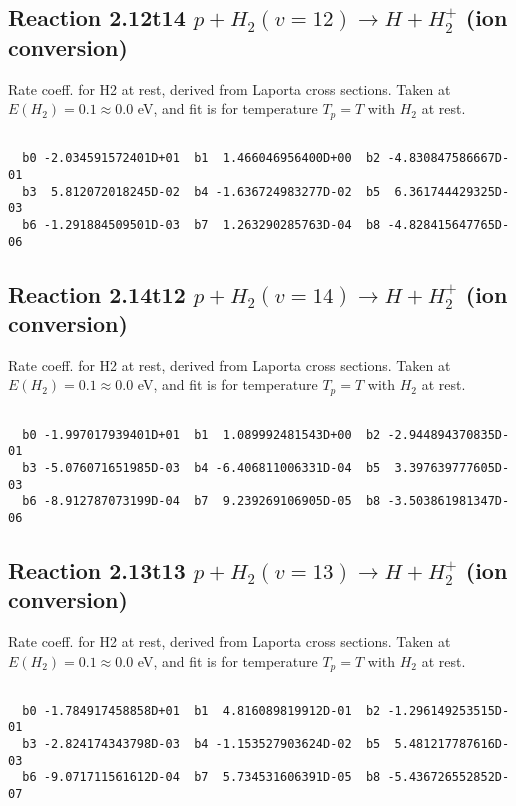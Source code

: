 \newpage
\subsection{
Reaction 2.12t14
$ p + H_2(v=12) \rightarrow H + H_2^+$ (ion conversion)
}
Rate coeff. for H2 at rest, derived from Laporta cross sections.
Taken at $E(H_2) = 0.1 \approx 0.0$ eV,  and fit is for temperature $T_p=T$ with $H_2$ at rest.

\begin{small}\begin{verbatim}

  b0 -2.034591572401D+01  b1  1.466046956400D+00  b2 -4.830847586667D-01
  b3  5.812072018245D-02  b4 -1.636724983277D-02  b5  6.361744429325D-03
  b6 -1.291884509501D-03  b7  1.263290285763D-04  b8 -4.828415647765D-06

\end{verbatim}\end{small}

\newpage
\subsection{
Reaction 2.14t12
$ p + H_2(v=14) \rightarrow H + H_2^+$ (ion conversion)
}
Rate coeff. for H2 at rest, derived from Laporta cross sections.
Taken at $E(H_2) = 0.1 \approx 0.0$ eV,  and fit is for temperature $T_p=T$ with $H_2$ at rest.

\begin{small}\begin{verbatim}

  b0 -1.997017939401D+01  b1  1.089992481543D+00  b2 -2.944894370835D-01
  b3 -5.076071651985D-03  b4 -6.406811006331D-04  b5  3.397639777605D-03
  b6 -8.912787073199D-04  b7  9.239269106905D-05  b8 -3.503861981347D-06

\end{verbatim}\end{small}

\newpage
\subsection{
Reaction 2.13t13
$ p + H_2(v=13) \rightarrow H + H_2^+$ (ion conversion)
}
Rate coeff. for H2 at rest, derived from Laporta cross sections.
Taken at $E(H_2) = 0.1 \approx 0.0$ eV,  and fit is for temperature $T_p=T$ with $H_2$ at rest.

\begin{small}\begin{verbatim}

  b0 -1.784917458858D+01  b1  4.816089819912D-01  b2 -1.296149253515D-01
  b3 -2.824174343798D-03  b4 -1.153527903624D-02  b5  5.481217787616D-03
  b6 -9.071711561612D-04  b7  5.734531606391D-05  b8 -5.436726552852D-07

\end{verbatim}\end{small}


